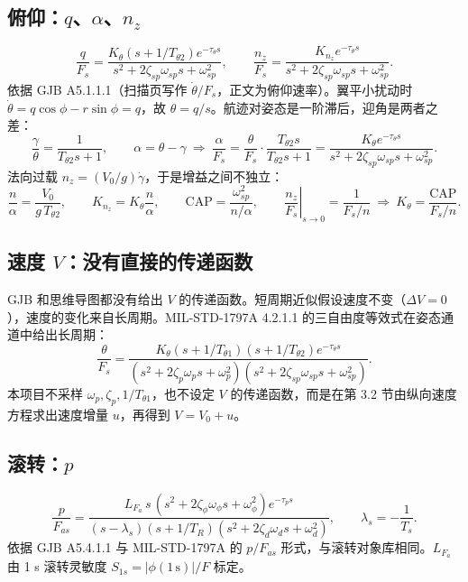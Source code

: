\documentclass[UTF8,a4paper,11pt,fontset=fandol,scheme=plain]{ctexart}
\begin{document}
\subsection{\texorpdfstring{俯仰：\(q\)、\(\alpha\)、\(n_z\)}{俯仰：q、α、nz}}
\begin{equation}
\frac{q}{F_s}=\frac{K_\theta(s+1/T_{\theta2})e^{-\tau_\theta s}}{s^2+2\zeta_{sp}\omega_{sp}s+\omega_{sp}^2},\qquad
\frac{n_z}{F_s}=\frac{K_{n_z}e^{-\tau_\theta s}}{s^2+2\zeta_{sp}\omega_{sp}s+\omega_{sp}^2}.
\end{equation}
依据 GJB A5.1.1.1（扫描页写作 \(\dot\theta/F_s\)，正文为俯仰速率）。翼平小扰动时 \(\dot\theta=q\cos\phi-r\sin\phi=q\)，故 \(\theta=q/s\)。航迹对姿态是一阶滞后，迎角是两者之差：
\begin{equation}
\frac{\gamma}{\theta}=\frac{1}{T_{\theta2}s+1},\qquad \alpha=\theta-\gamma\ \Rightarrow\ \frac{\alpha}{F_s}=\frac{\theta}{F_s}\cdot\frac{T_{\theta2}s}{T_{\theta2}s+1}=\frac{K_\theta e^{-\tau_\theta s}}{s^2+2\zeta_{sp}\omega_{sp}s+\omega_{sp}^2}.
\end{equation}
法向过载 \(n_z=(V_0/g)\dot\gamma\)，于是增益之间不独立：
\begin{equation}
\frac{n}{\alpha}=\frac{V_0}{g\,T_{\theta2}},\qquad K_{n_z}=K_\theta\frac{n}{\alpha},\qquad \mathrm{CAP}=\frac{\omega_{sp}^2}{n/\alpha},\qquad \left.\frac{n_z}{F_s}\right|_{s\to0}=\frac{1}{F_s/n}\ \Rightarrow\ K_\theta=\frac{\mathrm{CAP}}{F_s/n}.
\end{equation}

\subsection{\texorpdfstring{速度 \(V\)：没有直接的传递函数}{速度 V：没有直接的传递函数}}
GJB 和思维导图都没有给出 \(V\) 的传递函数。短周期近似假设速度不变（\(\Delta V=0\)），速度的变化来自长周期。MIL-STD-1797A 4.2.1.1 的三自由度等效式在姿态通道中给出长周期：
\begin{equation}
\frac{\theta}{F_s}=\frac{K_\theta(s+1/T_{\theta1})(s+1/T_{\theta2})e^{-\tau_\theta s}}{(s^2+2\zeta_p\omega_ps+\omega_p^2)(s^2+2\zeta_{sp}\omega_{sp}s+\omega_{sp}^2)}.
\end{equation}
本项目不采样 \(\omega_p,\zeta_p,1/T_{\theta1}\)，也不设定 \(V\) 的传递函数，而是在第 3.2 节由纵向速度方程求出速度增量 \(u\)，再得到 \(V=V_0+u\)。

\subsection{\texorpdfstring{滚转：\(p\)}{滚转：p}}
\begin{equation}
\frac{p}{F_{as}}=\frac{L_{F_a}\,s\,(s^2+2\zeta_\phi\omega_\phi s+\omega_\phi^2)e^{-\tau_p s}}{(s-\lambda_s)(s+1/T_R)(s^2+2\zeta_d\omega_d s+\omega_d^2)},\qquad \lambda_s=-\frac{1}{T_s}.
\end{equation}
依据 GJB A5.4.1.1 与 MIL-STD-1797A 的 \(p/F_{as}\) 形式，与滚转对象库相同。\(L_{F_a}\) 由 1 s 滚转灵敏度 \(S_{1s}=|\phi(1\,\mathrm s)|/F\) 标定。
\end{document}
